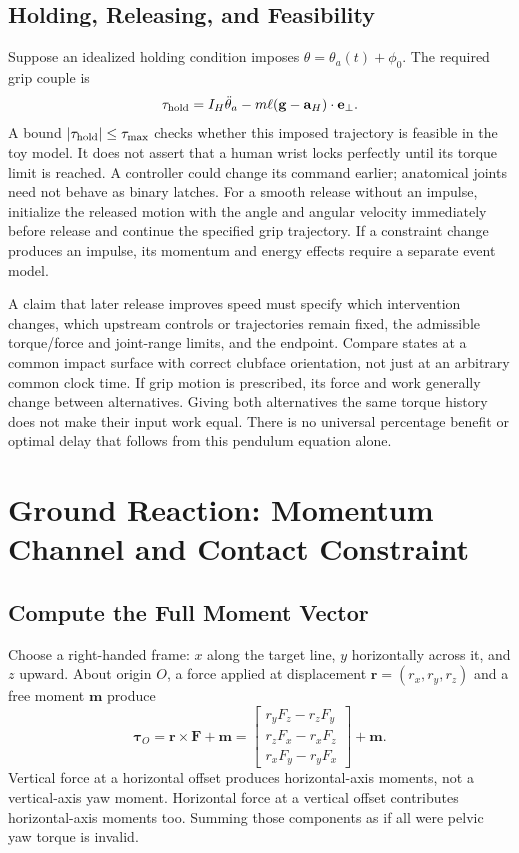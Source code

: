 \subsection{Holding, Releasing, and Feasibility}
Suppose an idealized holding condition imposes $\theta=\theta_a(t)+\phi_0$. The required grip couple is
\begin{equation}
\tau_{\rm hold}=I_H\ddot\theta_a-m\ell(\mathbf g-\mathbf a_H)\cdot\mathbf e_\perp.
\end{equation}
A bound $|\tau_{\rm hold}|\le\tau_{\max}$ checks whether this imposed trajectory is feasible in the toy model. It does not assert that a human wrist locks perfectly until its torque limit is reached. A controller could change its command earlier; anatomical joints need not behave as binary latches. For a smooth release without an impulse, initialize the released motion with the angle and angular velocity immediately before release and continue the specified grip trajectory. If a constraint change produces an impulse, its momentum and energy effects require a separate event model.

A claim that later release improves speed must specify which intervention changes, which upstream controls or trajectories remain fixed, the admissible torque/force and joint-range limits, and the endpoint. Compare states at a common impact surface with correct clubface orientation, not just at an arbitrary common clock time. If grip motion is prescribed, its force and work generally change between alternatives. Giving both alternatives the same torque history does not make their input work equal. There is no universal percentage benefit or optimal delay that follows from this pendulum equation alone.

\section{Ground Reaction: Momentum Channel and Contact Constraint}
\subsection{Compute the Full Moment Vector}
Choose a right-handed frame: $x$ along the target line, $y$ horizontally across it, and $z$ upward. About origin $O$, a force applied at displacement $\mathbf r=(r_x,r_y,r_z)$ and a free moment $\mathbf m$ produce
\begin{equation}
\boldsymbol\tau_O=\mathbf r\times\mathbf F+\mathbf m
=\begin{bmatrix}r_yF_z-r_zF_y\\r_zF_x-r_xF_z\\r_xF_y-r_yF_x\end{bmatrix}+\mathbf m.
\end{equation}
Vertical force at a horizontal offset produces horizontal-axis moments, not a vertical-axis yaw moment. Horizontal force at a vertical offset contributes horizontal-axis moments too. Summing those components as if all were pelvic yaw torque is invalid.

